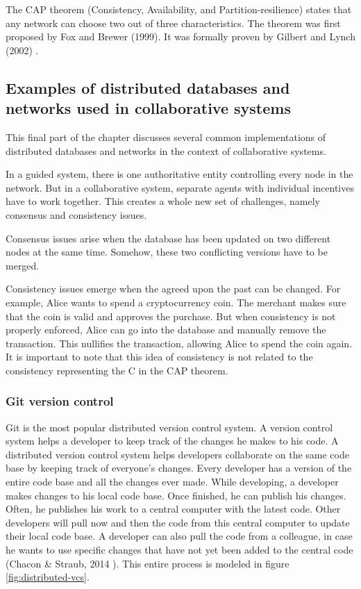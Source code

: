 The CAP theorem (Consistency, Availability, and Partition-resilience) states that any network can choose two out of three characteristics. The theorem was first proposed by Fox and Brewer (1999). It was formally proven by Gilbert and Lynch (2002) \cite{gilbert-lynch-cap-proof}.


\subsection{Examples of distributed databases and networks used in collaborative systems}


This final part of the chapter discusses several common implementations of distributed databases and networks in the context of collaborative systems. 

In a guided system, there is one authoritative entity controlling every node in the network. But in a collaborative system, separate agents with individual incentives have to work together. This creates a whole new set of challenges, namely consensus and consistency issues.

Consensus issues arise when the database has been updated on two different nodes at the same time. Somehow, these two conflicting versions have to be merged. %

Consistency issues emerge when the agreed upon the past can be changed. For example, Alice wants to spend a cryptocurrency coin. The merchant makes sure that the coin is valid and approves the purchase. But when consistency is not properly enforced, Alice can go into the database and manually remove the transaction. This nullifies the transaction, allowing Alice to spend the coin again. It is important to note that this idea of consistency is not related to the consistency representing the C in the CAP theorem.

\subsubsection{Git version control}

Git is the most popular distributed version control system. A version control system helps a developer to keep track of the changes he makes to his code. A distributed version control system helps developers collaborate on the same code base by keeping track of everyone's changes. Every developer has a version of the entire code base and all the changes ever made. While developing, a developer makes changes to his local code base. Once finished, he can publish his changes. Often, he publishes his work to a central computer with the latest code. Other developers will pull now and then the code from this central computer to update their local code base. A developer can also pull the code from a colleague, in case he wants to use specific changes that have not yet been added to the central code (Chacon \& Straub, 2014 \cite{git-manual-book}). This entire process is modeled in figure \ref{fig:distributed-vcs}.


